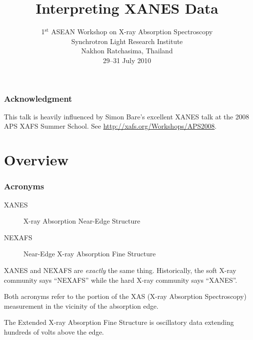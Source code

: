 \documentclass[10pt, xcolor=x11names, compress]{beamer}
\title{Interpreting XANES Data}
\date[1$^{\mathrm{st}}$ ASEAN XAS]{1$^{\mathrm{st}}$ ASEAN Workshop on
  X-ray Absorption Spectroscopy\\Synchrotron Light Research
  Institute\\Nakhon Ratchasima, Thailand \\29--31 July 2010}
\begin{document}
\maketitle





\begin{frame}
  \frametitle{Acknowledgment}

  This talk is heavily influenced by Simon Bare's excellent XANES talk
  at the 2008 APS XAFS Summer School.  See
  \href{http://xafs.org/Workshops/APS2008}
  {http://xafs.org/Workshops/APS2008}.
\end{frame}

\section[Overview]{Overview}

\begin{frame}
  \frametitle{Acronyms}
  \begin{description}
  \item[XANES] \alert{X}-ray \alert{A}bsorption
    \alert{N}ear-\alert{E}dge \alert{S}tructure
  \item[NEXAFS] \alert{N}ear-\alert{E}dge \alert{X}-ray
    \alert{A}bsorption \alert{F}ine \alert{S}tructure
  \end{description}

  \bigskip

  XANES and NEXAFS are \emph{exactly} the same thing.  Historically,
  the soft X-ray community says ``NEXAFS'' while the hard X-ray
  community says ``XANES''.

  \bigskip

  Both acronyms refer to the portion of the XAS (\alert{X}-ray
  \alert{A}bsorption \alert{S}pectroscopy) measurement in the vicinity
  of the absorption edge.

  \bigskip

  The \alert{E}xtended \alert{X}-ray \alert{A}bsorption \alert{F}ine
  \alert{S}tructure is oscillatory data extending hundreds of volts
  above the edge.
\end{frame}
\end{document}
